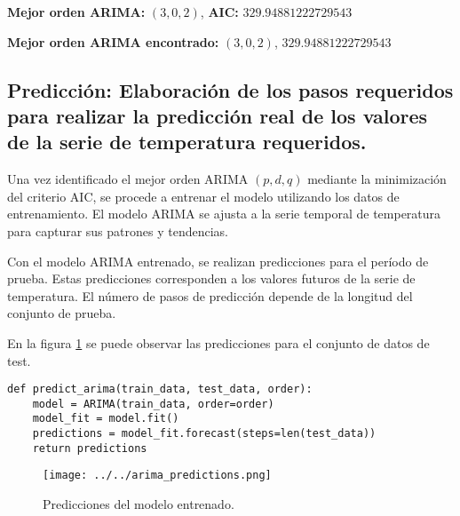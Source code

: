 \documentclass[12pt,letterpaper]{article}
\begin{document}
\textbf{Mejor orden ARIMA:} \((3, 0, 2)\), \textbf{AIC:} \(329.94881222729543\)

\textbf{Mejor orden ARIMA encontrado:}  \((3, 0, 2)\), \(329.94881222729543\)

\subsection{Predicción: Elaboración de los pasos requeridos para realizar la predicción real de
los valores de la serie de temperatura requeridos.}
Una vez identificado el mejor orden ARIMA \((p, d, q)\) mediante la minimización del criterio AIC, se procede a entrenar el modelo utilizando los datos de entrenamiento. El modelo ARIMA se ajusta a la serie temporal de temperatura para capturar sus patrones y tendencias.

Con el modelo ARIMA entrenado, se realizan predicciones para el período de prueba. Estas predicciones corresponden a los valores futuros de la serie de temperatura. El número de pasos de predicción depende de la longitud del conjunto de prueba.

En la figura \ref{fig:predictions} se puede observar las predicciones para el conjunto de datos de test.
\begin{lstlisting}
def predict_arima(train_data, test_data, order):
    model = ARIMA(train_data, order=order)
    model_fit = model.fit()
    predictions = model_fit.forecast(steps=len(test_data))
    return predictions
\end{lstlisting}

\begin{figure}[htp]
    \centering
    \texttt{[image: ../../arima\_predictions.png]}
    \caption{Predicciones del modelo entrenado.}
    \label{fig:predictions}
\end{figure}
\end{document}
